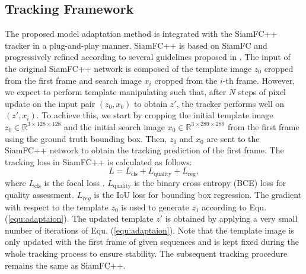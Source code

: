 \subsection{Tracking Framework}
The proposed model adaptation method is integrated with the SiamFC++ tracker \cite{SiamFC++} in a plug-and-play manner. SiamFC++ is based on SiamFC \cite{SiamFC} and progressively refined according to several guidelines proposed in \cite{SiamFC++}. The input of the original SiamFC++ network is composed of the template image $z_0$ cropped from the first frame and search image $x_i$ cropped from the $i$-th frame. However, we expect to perform template manipulating such that, after $N$ steps of pixel update on the input pair $(z_0, x_0)$ to obtain $z'$, the tracker performs well on $(z', x_i)$. To achieve this, we start by cropping the initial template image $z_0\in\mathbb R^{3\times128\times 128}$ and the initial search image $x_0\in\mathbb R^{3\times289\times 289}$ from the first frame using the ground truth bounding box.
Then, $z_0$ and $x_0$ are sent to the SiamFC++ network to obtain the tracking prediction of the first frame. The tracking loss in SiamFC++ \cite{SiamFC++} is calculated as follows:
\begin{equation}
    L = L_{\text{cls}} + L_{\text{quality}} + L_{\text{reg}},
\end{equation}
where $L_{\text{cls}}$ is the focal loss \cite{focal}. $L_{\text{quality}}$ is the binary cross entropy (BCE) loss for quality assessment. $L_{reg}$ is the IoU loss \cite{yu2016unitbox} for bounding box regression. The gradient with respect to the template $z_0$ is used to generate $z_1$ according to Equ. (\ref{equ:adaptaion}). The updated template $z'$ is obtained by applying a very small number of iterations of Equ. (\ref{equ:adaptaion}). Note that the template image is only updated with the first frame of given sequences and is kept fixed during the whole tracking process to ensure stability.
The subsequent tracking procedure remains the same as SiamFC++.

